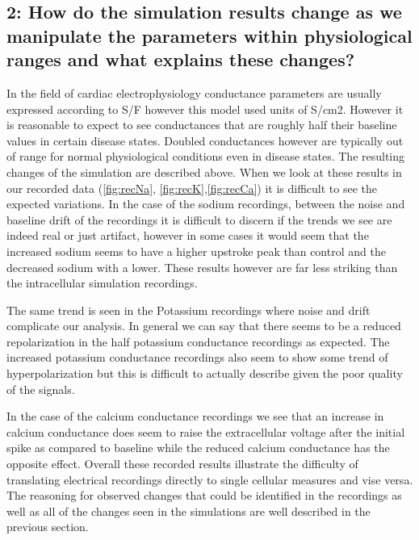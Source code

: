 \documentclass[12pt]{article}
\begin{document}
\subsection{2: How do the simulation results change as we manipulate the parameters within physiological ranges and what explains these changes? }
\par{}
In the field of cardiac electrophysiology conductance parameters are usually expressed according to S/F \cite{TenTusscher2003} however this model used units of S/cm2. However it is reasonable to expect to see conductances that are roughly half their baseline values in certain disease states.\cite{DaFaria2008} Doubled conductances however are typically out of range for normal physiological conditions even in disease states. The resulting changes of the simulation are described above. When we look at these results in our recorded data (\ref{fig:recNa}, \ref{fig:recK},\ref{fig:recCa}) it is difficult to see the expected variations. In the case of the sodium recordings, between the noise and baseline drift of the recordings it is difficult to discern if the trends we see are indeed real or just artifact, however in some cases it would seem that the increased sodium seems to have a higher upstroke peak than control and the decreased sodium with a lower. These results however are far less striking than the intracellular simulation recordings.
\par{}
The same trend is seen in the Potassium recordings where noise and drift complicate our analysis. In general we can say that there seems to be a reduced repolarization in the half potassium conductance recordings as expected. The increased potassium conductance recordings also seem to show some trend of hyperpolarization but this is difficult to actually describe given the poor quality of the signals.
\par{}
In the case of the calcium conductance recordings we see that an increase in calcium conductance does seem to raise the extracellular voltage after the initial spike as compared to baseline while the reduced calcium conductance has the opposite effect. Overall these recorded results illustrate the difficulty of translating electrical recordings directly to single cellular measures and vise versa. The reasoning for observed changes that could be identified in the recordings as well as all of the changes seen in the  simulations are well described in the previous section.
\end{document}
